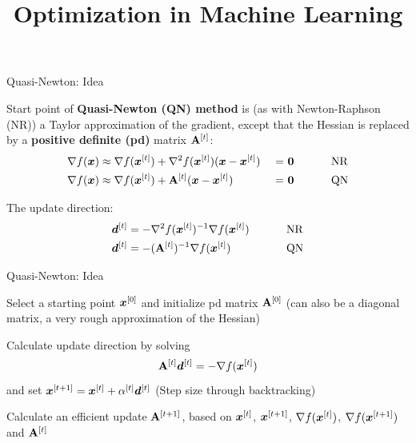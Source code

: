 \documentclass[11pt,compress,t,notes=noshow, xcolor=table]{beamer}
\title{Optimization in Machine Learning}
\begin{document}


\begin{framei}[fs=small]{Quasi-Newton: Idea}
\item Start point of \textbf{Quasi-Newton (QN) method} is (as with Newton-Raphson (NR)) a Taylor approximation of the gradient, except that the Hessian is replaced by a \textbf{positive definite (pd)} matrix $\mathbf{A}^{[t]}$:
\begin{alignat*}{4}
\nabla f(\bm{x}) &\approx  \nabla f(\bm{x}^{[t]}) + \nabla^2 f(\bm{x}^{[t]}) (\bm{x} - \bm{x}^{[t]}) ~ &=& ~\mathbf{0}  &\qquad& \text{ NR} \\
\nabla f(\bm{x}) &\approx \nabla f(\bm{x}^{[t]}) + \mathbf{A}^{[t]} (\bm{x} - \bm{x}^{[t]}) ~ &=& ~ \mathbf{0} &\qquad& \text{ QN}
\end{alignat*}
\item The update direction:
\begin{alignat*}{3}
\bm{d}^{[t]} &= - \nabla^2 f(\bm{x}^{[t]})^{-1} \nabla f(\bm{x}^{[t]}) &\qquad& \text{ NR} \\
\bm{d}^{[t]} &= - (\mathbf{A}^{[t]})^{-1} \nabla f(\bm{x}^{[t]}) &\qquad& \text{ QN}
\end{alignat*}
\end{framei}


\begin{framei}{Quasi-Newton: Idea}
\item Select a starting point $\bm{x}^{[0]}$ and initialize pd matrix $\mathbf{A}^{[0]}$ (can also be a diagonal matrix, a very rough approximation of the Hessian)
\item Calculate update direction by solving
$$
\mathbf{A}^{[t]} \bm{d}^{[t]} = - \nabla f(\bm{x}^{[t]})
$$
and set $\bm{x}^{[t+1]} = \bm{x}^{[t]} + \alpha^{[t]} \bm{d}^{[t]}$ (Step size through backtracking)
\item Calculate an efficient update $\mathbf{A}^{[t+1]}$, based on $\bm{x}^{[t]}$, $\bm{x}^{[t+1]}$, $\nabla f(\bm{x}^{[t]})$, $\nabla f(\bm{x}^{[t+1]})$ and $\mathbf{A}^{[t]}$
\end{framei}
\end{document}
